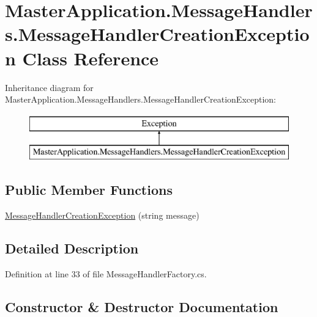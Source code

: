 \hypertarget{class_master_application_1_1_message_handlers_1_1_message_handler_creation_exception}{}\section{Master\+Application.\+Message\+Handlers.\+Message\+Handler\+Creation\+Exception Class Reference}
\label{class_master_application_1_1_message_handlers_1_1_message_handler_creation_exception}
Inheritance diagram for Master\+Application.\+Message\+Handlers.\+Message\+Handler\+Creation\+Exception\+:\begin{figure}[H]
\begin{center}
\leavevmode
\includegraphics[height=2.000000cm]{class_master_application_1_1_message_handlers_1_1_message_handler_creation_exception}
\end{center}
\end{figure}
\subsection*{Public Member Functions}
\begin{DoxyCompactItemize}
\item 
\mbox{\hyperlink{class_master_application_1_1_message_handlers_1_1_message_handler_creation_exception_a8033ffb0c1751f6c6bb9aabcc0631270}{Message\+Handler\+Creation\+Exception}} (string message)
\end{DoxyCompactItemize}


\subsection{Detailed Description}


Definition at line 33 of file Message\+Handler\+Factory.\+cs.



\subsection{Constructor \& Destructor Documentation}
\mbox{\label{class_master_application_1_1_message_handlers_1_1_message_handler_creation_exception_a8033ffb0c1751f6c6bb9aabcc0631270}} 
